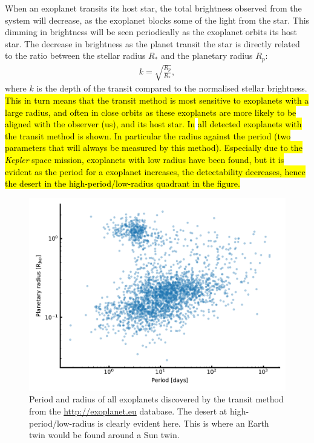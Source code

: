 When an exoplanet transits its host star, the total brightness observed from the system will
decrease, as the exoplanet blocks some of the light from the star. This dimming in brightness will
be seen periodically as the exoplanet orbits its host star. The decrease in brightness as the planet
transit the star is directly related to the ratio between the stellar radius $R_\ast$ and the
planetary radius $R_p$:
\begin{align}
  k = \sqrt{\frac{R_p}{R_\ast}},  \label{eq:transit}
\end{align}
where $k$ is the depth of the transit compared to the normalised stellar brightness. \hl{This in
turn means that the transit method is most sensitive to exoplanets with a large radius, and often in
close orbits as these exoplanets are more likely to be aligned with the observer (us), and its host
star. In}  \hl{all detected exoplanets with the transit method is shown. In
particular the radius against the period (two parameters that will always be measured by this
method). Especially due to the \emph{Kepler} space mission, exoplanets with low radius have been
found, but it is evident as the period for a exoplanet increases, the detectability decreases, hence
the desert in the high-period/low-radius quadrant in the figure.}

\begin{figure}[htpb!]
    \centering
    \includegraphics[width=1.0\linewidth]{figures/transitAll.pdf}
    \caption{Period and radius of all exoplanets discovered by the transit method from the
             \url{http://exoplanet.eu} database. The desert at high-period/low-radius is clearly
             evident here. This is where an Earth twin would be found around a Sun twin.}
    \label{fig:transitAll}
\end{figure}

